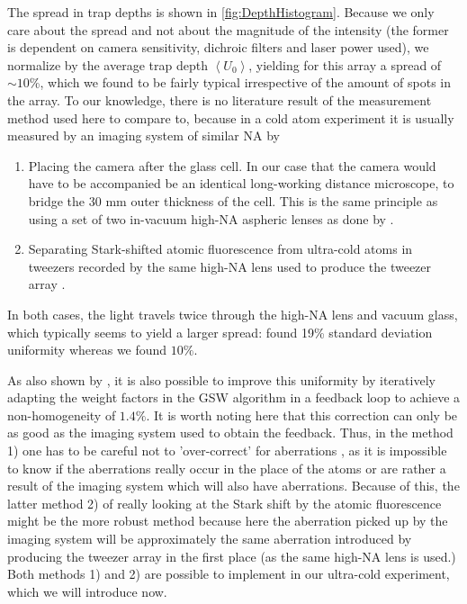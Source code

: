 The spread in trap depths is shown in \cref{fig:DepthHistogram}.
Because we only care about the spread and not about the magnitude of the intensity (the former is dependent on camera sensitivity, dichroic filters and laser power used), we normalize by the average trap depth $\left\langle U_0 \right\rangle$, yielding for this array a spread of $\sim 10$\%, which we found to be fairly typical irrespective of the amount of spots in the array.
To our knowledge, there is no literature result of the measurement method used here to compare to, because in a cold atom experiment it is usually measured by an imaging system of similar \ac{NA} by

\begin{enumerate}
    \item Placing the camera after the glass cell. 
    In our case that the camera would have to be accompanied be an identical long-working distance microscope, to bridge the 30 mm outer thickness of the cell.
    This is the same principle as using a set of two in-vacuum high-NA aspheric lenses as done by \cite{Nogrette2014}.
    
    \item Separating Stark-shifted atomic fluorescence from ultra-cold atoms in tweezers recorded by the same high-NA lens used to produce the tweezer array \cite{Ebadi2021}.
\end{enumerate}
In both cases, the light travels twice through the high-NA lens and vacuum glass, which typically seems to yield a larger spread: \cite{Nogrette2014} found 19\% standard deviation uniformity whereas we found $10\%$.

As also shown by \cite{Nogrette2014}, it is also possible to improve this uniformity by iteratively adapting the weight factors in the \ac{GSW} algorithm in a feedback loop to achieve a non-homogeneity of $1.4\%$.
It is worth noting here that this correction can only be as good as the imaging system used to obtain the feedback. 
Thus, in the method 1) one has to be careful not to 'over-correct' for aberrations \cite{Labuhn2016}, as it is impossible to know if the aberrations really occur in the place of the atoms or are rather a result of the imaging system which will also have aberrations. 
Because of this, the latter method 2) of really looking at the Stark shift by the atomic fluorescence might be the more robust method because here the aberration picked up by the imaging system will be approximately the same aberration introduced by producing the tweezer array in the first place (as the same high-NA lens is used.)
Both methods 1) and 2) are possible to implement in our ultra-cold experiment, which we will introduce now.







